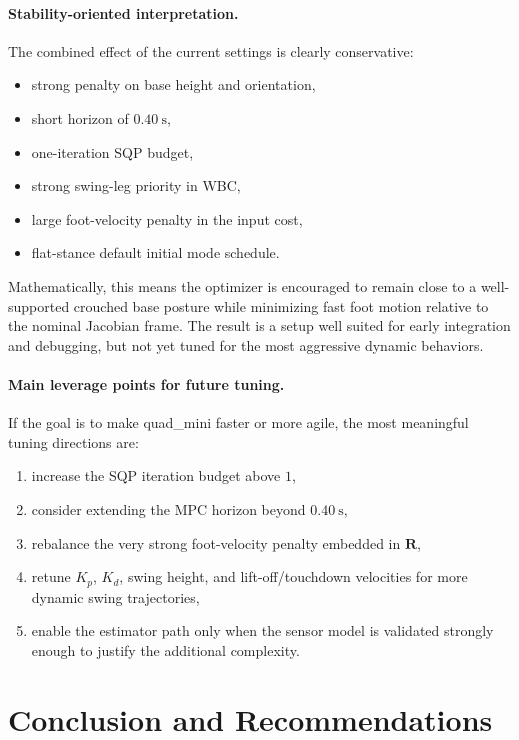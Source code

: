 \documentclass[11pt,a4paper]{article}
\newcommand{\mat}[1]{\mathbf{#1}}
\begin{document}
\paragraph{Stability-oriented interpretation.}
The combined effect of the current settings is clearly conservative:
\begin{itemize}[leftmargin=*]
  \item strong penalty on base height and orientation,
  \item short horizon of $0.40~\mathrm{s}$,
  \item one-iteration SQP budget,
  \item strong swing-leg priority in WBC,
  \item large foot-velocity penalty in the input cost,
  \item flat-stance default initial mode schedule.
\end{itemize}
Mathematically, this means the optimizer is encouraged to remain close to a well-supported crouched base posture while minimizing fast foot
motion relative to the nominal Jacobian frame. The result is a setup well suited for early integration and debugging, but not yet tuned for
the most aggressive dynamic behaviors.

\paragraph{Main leverage points for future tuning.}
If the goal is to make quad\_mini faster or more agile, the most meaningful tuning directions are:
\begin{enumerate}[leftmargin=*]
  \item increase the SQP iteration budget above $1$,
  \item consider extending the MPC horizon beyond $0.40~\mathrm{s}$,
  \item rebalance the very strong foot-velocity penalty embedded in $\mat{R}$,
  \item retune $K_p$, $K_d$, swing height, and lift-off/touchdown velocities for more dynamic swing trajectories,
  \item enable the estimator path only when the sensor model is validated strongly enough to justify the additional complexity.
\end{enumerate}

\section{Conclusion and Recommendations}
\end{document}
